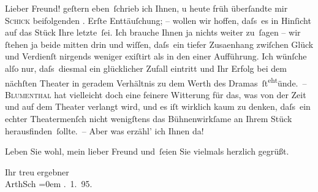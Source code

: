 \pstart{}Lieber Freund!\pend\vspace{0.5em}
\pstart
           geſtern eben ſchrieb ich Ihnen, u heute früh überſandte mir \textsc{Schick} beifolgenden \label{K_L03921-1v}\label{K_L03921-1}. Erſte
               Enttäuſchung; – wollen wir hoffen, daſs es in Hinſicht auf das Stück Ihre letzte ſei. Ich brauche Ihnen ja
               nichts weiter zu ſagen – wir{ }ſtehen ja beide mitten drin und wiſſen, {\pb}daſs ein tiefer Zusa{\geminationm}enhang zwiſchen Glück und Verdienſt
               nirgends weniger exiſtirt als in den \textsc{\label{K_L03921-2v}\label{K_L03921-2}} einer Aufführung. Ich wünſche alſo
               nur, daſs diesmal ein glücklicher Zufall eintritt und Ihr Erfolg bei dem nächſten
               Theater in geradem Verhältnis zu dem Werth des Dramas ſt\substVorne{}\textsuperscript{eht}\substDazwischen{}ünde\substHinten{}. – \textsc{Blumenthal} hat vielleicht doch eine feinere {\pb}Witterung für das,
               was von der Zeit und auf dem Theater verlangt wird, und es iſt wirklich kaum zu
               denken, daſs ein echter Theatermenſch nicht wenigſtens das Bühnenwirkſame an Ihrem
               Stück herausfinden ſollte. – Aber was erzähl’ ich Ihnen da!\pend
           
\pstart
           Leben Sie wohl, mein lieber Freund und ſeien Sie vielmals herzlich {\pb}gegrüßt.\pend
           
\pstart
           Ihr treu ergebner{\\[\baselineskip]}\spacefill\mbox{ArthSch}\pend
           \leftskip=0em{}
. 1. 95.\pend
           \endnumbering{}
\begin{anhang}
\end{anhang}\newcommand{\dateiname}{L03921}\newcommand{\titel}{Arthur Schnitzler an Theodor Herzl, 30. 1. 1895}\newcommand{\editorInnen}{Herausgegeben von Jahnke, SelmaMüller, Martin Anton}
